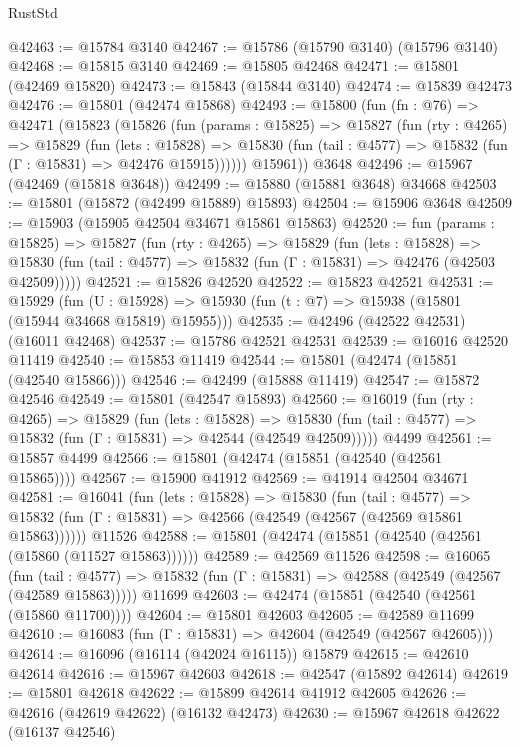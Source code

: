 \begin{lexlean}{RustStd}
\begin{coremodule}
@42463 := @15784 @3140
@42467 := @15786 (@15790 @3140) (@15796 @3140)
@42468 := @15815 @3140
@42469 := @15805 @42468
@42471 := @15801 (@42469 @15820)
@42473 := @15843 (@15844 @3140)
@42474 := @15839 @42473
@42476 := @15801 (@42474 @15868)
@42493 := @15800
    (fun (fn : @76) =>
    @42471
      (@15823
        (@15826
          (fun (params : @15825) =>
          @15827
            (fun (rty : @4265) =>
            @15829
              (fun (lets : @15828) =>
              @15830 (fun (tail : @4577) => @15832 (fun (Γ : @15831) => @42476 @15915))))))
        @15961))
    @3648
@42496 := @15967 (@42469 (@15818 @3648))
@42499 := @15880 (@15881 @3648) @34668
@42503 := @15801 (@15872 (@42499 @15889) @15893)
@42504 := @15906 @3648
@42509 := @15903 (@15905 @42504 @34671 @15861 @15863)
@42520 := fun (params : @15825) =>
  @15827
    (fun (rty : @4265) =>
    @15829
      (fun (lets : @15828) =>
      @15830 (fun (tail : @4577) => @15832 (fun (Γ : @15831) => @42476 (@42503 @42509)))))
@42521 := @15826 @42520
@42522 := @15823 @42521
@42531 := @15929
    (fun (U : @15928) => @15930 (fun (t : @7) => @15938 (@15801 (@15944 @34668 @15819) @15955)))
@42535 := @42496 (@42522 @42531) (@16011 @42468)
@42537 := @15786 @42521 @42531
@42539 := @16016 @42520 @11419
@42540 := @15853 @11419
@42544 := @15801 (@42474 (@15851 (@42540 @15866)))
@42546 := @42499 (@15888 @11419)
@42547 := @15872 @42546
@42549 := @15801 (@42547 @15893)
@42560 := @16019
    (fun (rty : @4265) =>
    @15829
      (fun (lets : @15828) =>
      @15830 (fun (tail : @4577) => @15832 (fun (Γ : @15831) => @42544 (@42549 @42509)))))
    @4499
@42561 := @15857 @4499
@42566 := @15801 (@42474 (@15851 (@42540 (@42561 @15865))))
@42567 := @15900 @41912
@42569 := @41914 @42504 @34671
@42581 := @16041
    (fun (lets : @15828) =>
    @15830
      (fun (tail : @4577) =>
      @15832 (fun (Γ : @15831) => @42566 (@42549 (@42567 (@42569 @15861 @15863))))))
    @11526
@42588 := @15801 (@42474 (@15851 (@42540 (@42561 (@15860 (@11527 @15863))))))
@42589 := @42569 @11526
@42598 := @16065
    (fun (tail : @4577) => @15832 (fun (Γ : @15831) => @42588 (@42549 (@42567 (@42589 @15863)))))
    @11699
@42603 := @42474 (@15851 (@42540 (@42561 (@15860 @11700))))
@42604 := @15801 @42603
@42605 := @42589 @11699
@42610 := @16083 (fun (Γ : @15831) => @42604 (@42549 (@42567 @42605)))
@42614 := @16096 (@16114 (@42024 @16115)) @15879
@42615 := @42610 @42614
@42616 := @15967 @42603
@42618 := @42547 (@15892 @42614)
@42619 := @15801 @42618
@42622 := @15899 @42614 @41912 @42605
@42626 := @42616 (@42619 @42622) (@16132 @42473)
@42630 := @15967 @42618 @42622 (@16137 @42546)

\end{coremodule}
\end{lexlean}
